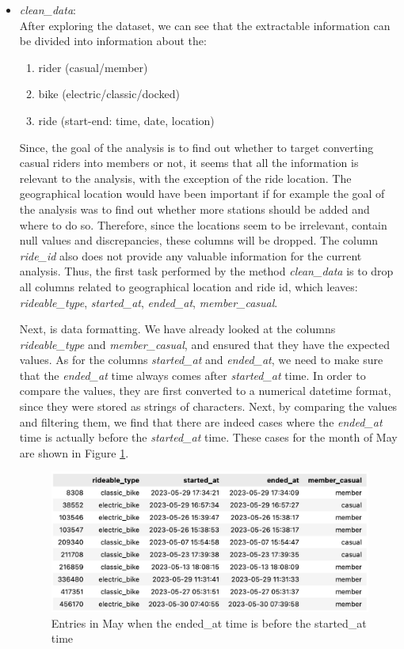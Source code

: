 \documentclass[12pt]{article}
\begin{document}
\begin{itemize}
	\item \textit{clean\_data}:\\
	After exploring the dataset, we can see that the extractable information can be divided into information about the:
	\begin{enumerate} 
	\item rider (casual/member)
	\item bike (electric/classic/docked)
	\item ride (start-end: time, date, location)
	\end{enumerate}
Since, the goal of the analysis is to find out whether to target converting casual riders into members or not, it seems that all the information is relevant to the analysis, with the exception of the ride location. The geographical location would have been important if for example the goal of the analysis was to find out whether more stations should be added and where to do so. Therefore, since the locations seem to be irrelevant, contain null values and discrepancies, these columns will be dropped. The column \textit{ride\_id} also does not provide any valuable information for the current analysis. Thus, the first task performed by the method \textit{clean\_data} is to drop all columns related to geographical location and ride id, which leaves: \textit{rideable\_type}, \textit{started\_at}, \textit{ended\_at}, \textit{member\_casual}. 


Next, is data formatting. We have already looked at the columns \textit{rideable\_type} and \textit{member\_casual}, and ensured that they have the expected values. As for the columns \textit{started\_at} and \textit{ended\_at}, we need to make sure that the \textit{ended\_at} time always comes after \textit{started\_at} time. In order to compare the values, they are first converted to a numerical datetime format, since they were stored as strings of characters. Next, by comparing the values and filtering them, we find that there are indeed cases where the \textit{ended\_at} time is actually before the \textit{started\_at} time. These cases for the month of May are shown in Figure \ref{fig8}.

	\begin{figure}[h]
	\centering
	\includegraphics[scale=0.56]{imgNEG.png}
	\caption{Entries in May when the ended\_at time is before the started\_at time}
	\label{fig8}
	\end{figure}


\end{itemize}
\end{document}

